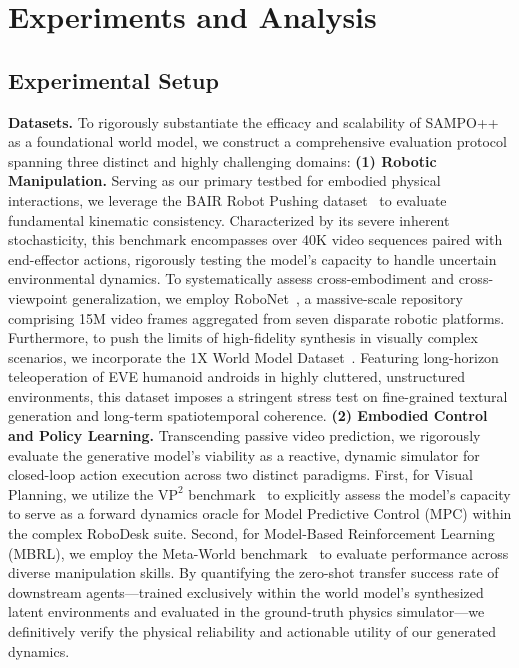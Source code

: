 \section{Experiments and Analysis}
\label{Sec4:Experiments}


\subsection{Experimental Setup}

\textbf{Datasets.} 
To rigorously substantiate the efficacy and scalability of SAMPO++ as a foundational world model, we construct a comprehensive evaluation protocol spanning three distinct and highly challenging domains:
\textbf{(1) Robotic Manipulation.} Serving as our primary testbed for embodied physical interactions, we leverage the BAIR Robot Pushing dataset~\cite{ebert2017selfBAIR} to evaluate fundamental kinematic consistency. Characterized by its severe inherent stochasticity, this benchmark encompasses over 40K video sequences paired with end-effector actions, rigorously testing the model's capacity to handle uncertain environmental dynamics. To systematically assess cross-embodiment and cross-viewpoint generalization, we employ RoboNet~\cite{dasari2019robonet}, a massive-scale repository comprising 15M video frames aggregated from seven disparate robotic platforms. Furthermore, to push the limits of high-fidelity synthesis in visually complex scenarios, we incorporate the 1X World Model Dataset~\cite{1X_Technologies_1X_World_Model_2024}. Featuring long-horizon teleoperation of EVE humanoid androids in highly cluttered, unstructured environments, this dataset imposes a stringent stress test on fine-grained textural generation and long-term spatiotemporal coherence.
\textbf{(2) Embodied Control and Policy Learning.} Transcending passive video prediction, we rigorously evaluate the generative model's viability as a reactive, dynamic simulator for closed-loop action execution across two distinct paradigms. First, for Visual Planning, we utilize the $\text{VP}^2$ benchmark~\cite{tian2023control} to explicitly assess the model's capacity to serve as a forward dynamics oracle for Model Predictive Control (MPC) within the complex RoboDesk suite. Second, for Model-Based Reinforcement Learning (MBRL), we employ the Meta-World benchmark~\cite{yu2020meta} to evaluate performance across diverse manipulation skills. By quantifying the zero-shot transfer success rate of downstream agents—trained exclusively within the world model's synthesized latent environments and evaluated in the ground-truth physics simulator—we definitively verify the physical reliability and actionable utility of our generated dynamics.
